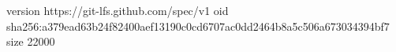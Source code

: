 version https://git-lfs.github.com/spec/v1
oid sha256:a379ead63b24f82400aef13190c0cd6707ac0dd2464b8a5c506a673034394bf7
size 22000
